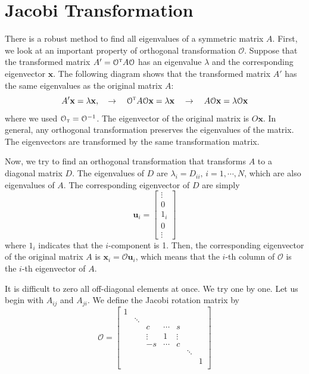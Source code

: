 {\noindent
\section{Jacobi Transformation}

There is a robust method to find all eigenvalues of a symmetric matrix $A$.  First, we look at an important property of orthogonal transformation $\mathcal{O}$.  Suppose that the transformed matrix $A'=\mathcal{O}^\textsc{t} A \mathcal{O}$ has an eigenvalue $\lambda$ and the corresponding eigenvector $\mathbf{x}$. The following diagram shows that the transformed matrix $A'$ has the same eigenvalues as the original matrix $A$:
\begin{equation}
A' \mathbf{x} = \lambda \mathbf{x}, \quad \rightarrow \quad  \mathcal{O}^\textsc{t} A \mathcal{O} \mathbf{x} = \lambda \mathbf{x}
\quad \rightarrow \quad A \mathcal{O} \mathbf{x} = \lambda \mathcal{O} \mathbf{x}
\end{equation}
where we used $\mathcal{O}_\textsc{t}=\mathcal{O}^{-1}$. The eigenvector of the original matrix is $O \mathbf{x}$.
In general, any orthogonal transformation preserves the eigenvalues of the matrix.  The eigenvectors are transformed by the same transformation matrix.

Now, we try to find an orthogonal transformation that transforms $A$ to a diagonal matrix $D$. The eigenvalues of $D$ are $\lambda_i=D_{ii},\, i=1, \cdots, N$, which are also eigenvalues of $A$.  The corresponding eigenvector of $D$ are simply
\begin{equation}\label{eq:eigenvector_unit}
\mathbf{u}_i = \begin{bmatrix} \vdots \\ 0 \\ 1_i \\ 0 \\ \vdots\end{bmatrix}
\end{equation}
where $1_i$ indicates that the $i$-component is 1.
Then, the corresponding eigenvector of the original matrix $A$ is $\mathbf{x}_i = \mathcal{O} \mathbf{u}_i$, which means that the $i$-th column of $\mathcal{O}$ is the $i$-th eigenvector of $A$.

It is difficult to zero all off-diagonal elements at once. We try one by one. Let us begin with  $A_{ij}$ and $A_{ji}$.  We define the Jacobi rotation matrix by
\begin{equation}\label{eq:jacobi_rot_matrix}
\mathcal{O} = 
\begin{bmatrix}
1 &        &        &        &        &         &  \\
  & \ddots &        &        &        &         &  \\
  &        &   c    & \cdots &   s    &         &  \\
  &        & \vdots &    1   & \vdots &         &  \\
  &        &   -s   & \cdots &   c    &         & \\
  &        &        &        &        &  \ddots & \\
  &        &        &        &        &         & 1\\
  

\end{bmatrix}
\end{equation}}
